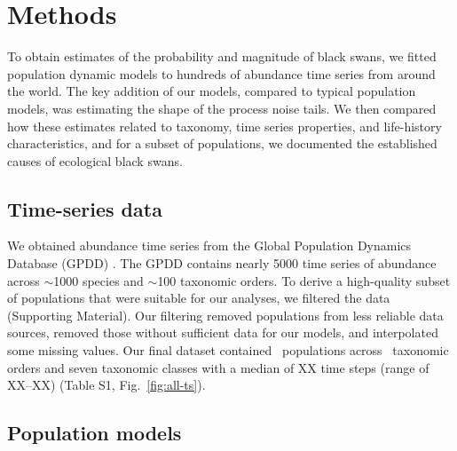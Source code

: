 
\section{Methods}

To obtain estimates of the probability and magnitude of black swans, we fitted
population dynamic models to hundreds of abundance time series from around the
world. The key addition of our models, compared to typical population models,
was estimating the shape of the process noise tails. We then compared how these
estimates related to taxonomy, time series properties, and life-history
characteristics, and for a subset of populations, we documented the established
causes of ecological black swans.

\subsection{Time-series data}

We obtained abundance time series from the Global Population Dynamics Database
(GPDD) \citep{gpdd2010}. The GPDD contains nearly 5000 time series of abundance
across $\sim$1000 species and $\sim$100 taxonomic orders. To derive
a high-quality subset of populations that were suitable for our analyses, we
filtered the data (Supporting Material). Our filtering removed populations from
less reliable data sources, removed those without sufficient data for our
models, and interpolated some missing values. Our final dataset contained
\NPops~populations across \NOrders~taxonomic orders and seven taxonomic classes
with a median of XX time steps (range of XX--XX) (Table S1,
Fig.~\ref{fig:all-ts}).

\subsection{Population models}


